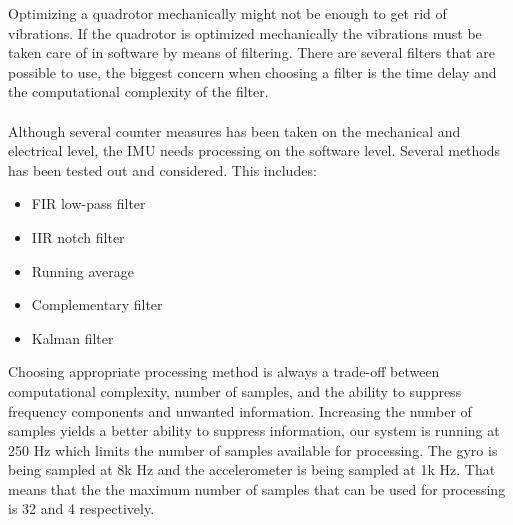 Optimizing a quadrotor mechanically might not be enough to get rid of vibrations. If the quadrotor is optimized mechanically the vibrations must be taken care of in software by means of filtering. There are several filters that are possible to use, the biggest concern when choosing a filter is the time delay and the computational complexity of the filter.
\\
\\
Although several counter measures has been taken on the mechanical and electrical level, the IMU needs processing on the software level. Several methods has been tested out and considered. This includes:
\begin{itemize}
    \item FIR low-pass filter
    \item IIR notch filter
    \item Running average
    \item Complementary filter
    \item Kalman filter
\end{itemize}
Choosing appropriate processing method is always a trade-off between computational complexity, number of samples, and the ability to suppress frequency components and unwanted information. Increasing the number of samples yields a better ability to suppress information, our system is running at 250 Hz which limits the number of samples available for processing. The gyro is being sampled at 8k Hz and the accelerometer is being sampled at 1k Hz. That means that the the maximum number of samples that can be used for processing is 32 and 4 respectively.

